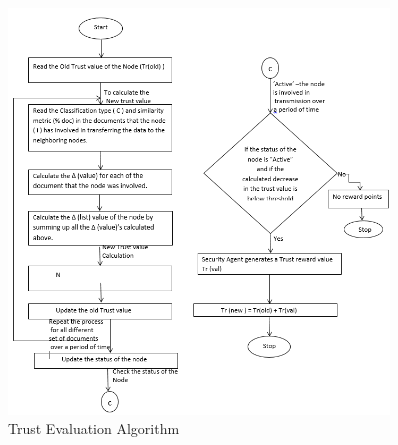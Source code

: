 \begin{figure}[h!]
    \label{fig:TrustAlgorithm}
    \begin{center}
        \includegraphics[width=0.90\textwidth]{Figures/Trust_Algorithm.PNG}
        \caption{Trust Evaluation Algorithm}
    \end{center}
\end{figure}
  
